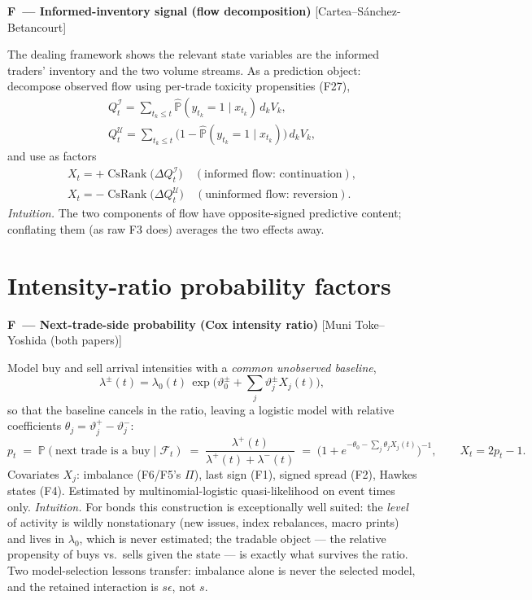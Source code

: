\documentclass[11pt]{article}
\newcommand{\Prob}{\mathbb{P}}
\newcommand{\Rank}{\operatorname{CsRank}}
\newcounter{fac}
\newcommand{\factor}[2]{%
  \refstepcounter{fac}%
  \par\medskip\noindent\textbf{F\thefac\ --- #1} \hfill {\small[#2]}\par\nopagebreak}
\begin{document}
\factor{Informed-inventory signal (flow decomposition)}{Cartea--S\'anchez-Betancourt}
The dealing framework shows the relevant state variables are the informed traders' inventory and the two volume streams. As a prediction object: decompose observed flow using per-trade toxicity propensities (F27),
\begin{gather*}
Q^{\mathcal I}_t = \sum_{t_k \le t} \widehat{\Prob}(y_{t_k}=1\mid x_{t_k})\, d_k V_k,\\
Q^{\mathcal U}_t = \sum_{t_k \le t} \big(1-\widehat{\Prob}(y_{t_k}=1\mid x_{t_k})\big)\, d_k V_k,
\end{gather*}
and use as factors
\begin{gather*}
X_t = +\Rank\big(\Delta Q^{\mathcal I}_t\big) \quad (\text{informed flow: continuation}),\\
X_t = -\Rank\big(\Delta Q^{\mathcal U}_t\big) \quad (\text{uninformed flow: reversion}).
\end{gather*}
\emph{Intuition.} The two components of flow have opposite-signed predictive content; conflating them (as raw F3 does) averages the two effects away.

\section{Intensity-ratio probability factors}\label{sec:ratio}

\factor{Next-trade-side probability (Cox intensity ratio)}{Muni Toke--Yoshida (both papers)}
Model buy and sell arrival intensities with a \emph{common unobserved baseline},
\[
\lambda^{\pm}(t) = \lambda_0(t)\, \exp\!\Big( \vartheta^{\pm}_0 + \sum_j \vartheta^{\pm}_j X_j(t) \Big),
\]
so that the baseline cancels in the ratio, leaving a logistic model with relative coefficients $\theta_j = \vartheta^{+}_j - \vartheta^{-}_j$:
\[
p_t \;=\; \Prob(\text{next trade is a buy} \mid \mathcal F_t)
\;=\; \frac{\lambda^{+}(t)}{\lambda^{+}(t)+\lambda^{-}(t)}
\;=\; \Big(1 + e^{-\theta_0 - \sum_j \theta_j X_j(t)}\Big)^{-1},
\qquad X_t = 2p_t - 1 .
\]
Covariates $X_j$: imbalance (F6/F5's $\Pi$), last sign (F1), signed spread (F2), Hawkes states (F4). Estimated by multinomial-logistic quasi-likelihood on event times only.
\emph{Intuition.} For bonds this construction is exceptionally well suited: the \emph{level} of activity is wildly nonstationary (new issues, index rebalances, macro prints) and lives in $\lambda_0$, which is never estimated; the tradable object --- the relative propensity of buys vs.\ sells given the state --- is exactly what survives the ratio. Two model-selection lessons transfer: imbalance alone is never the selected model, and the retained interaction is $s\epsilon$, not $s$.
\end{document}
